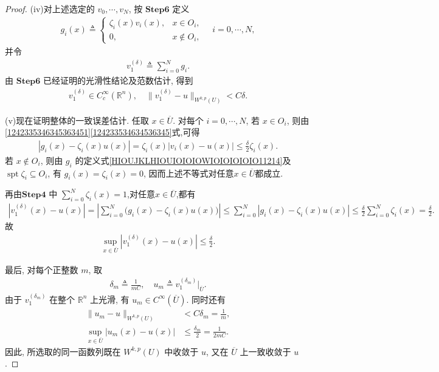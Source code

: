 \documentclass[../../main.tex]{subfiles}
\begin{document}
\begin{proof}
(iv)对上述选定的 $v_0,\cdots,v_N$, 按 $\mathbf{Step}\mathbf{6}$ 定义
\begin{align}\label{HIOUJKLHIOUIOIOIOWIOIOIOIOIO11214}
g_i(x)\triangleq
\begin{cases}
\zeta_i(x)v_i(x),&x\in O_i,\\
0,&x\notin O_i,
\end{cases}
\quad i=0,\cdots,N,
\end{align}
并令
\begin{align*}
v_1^{(\delta)}
\triangleq
\sum\limits_{i=0}^{N}g_i.
\end{align*}
由 $\mathbf{Step}\mathbf{6}$ 已经证明的光滑性结论及范数估计, 得到
\begin{align*}
v_1^{(\delta)}\in C_c^\infty(\mathbb{R}^{n}),\quad
\|v_1^{(\delta)}-u\|_{W^{k,p}(U)}<C\delta.
\end{align*}

(v)现在证明整体的一致误差估计. 任取 $x\in\overline{U}$.
对每个 $i=0,\cdots,N$, 若 $x\in O_i$, 则由\eqref{1242335346345363451}\eqref{124233534634536345}式,可得
\begin{align*}
|g_i(x)-\zeta_i(x)u(x)|
=
\zeta_i(x)|v_i(x)-u(x)|
\leqslant\frac{\delta}{2}\zeta_i(x).
\end{align*}
若 $x\notin O_i$, 则由 $g_i$ 的定义式\eqref{HIOUJKLHIOUIOIOIOWIOIOIOIOIO11214}及 $\operatorname{spt}\zeta_i\subseteq O_i$, 有
$g_i(x)=\zeta_i(x)=0$, 因而上述不等式对任意$x\in\overline{U}$都成立.

再由$\mathbf{Step}\mathbf{4}$ 中 $\sum\limits_{i=0}^{N}\zeta_i(x)=1$,对任意$x\in\overline{U}$,都有
\begin{align*}
|v_1^{(\delta)}(x)-u(x)|
=
\left|
\sum\limits_{i=0}^{N}
\bigl(g_i(x)-\zeta_i(x)u(x)\bigr)
\right|\leqslant
\sum\limits_{i=0}^{N}
|g_i(x)-\zeta_i(x)u(x)|
\leqslant
\frac{\delta}{2}
\sum\limits_{i=0}^{N}\zeta_i(x)
=\frac{\delta}{2}.
\end{align*}
故
\begin{align*}
\sup\limits_{x\in\overline{U}}
|v_1^{(\delta)}(x)-u(x)|
\leqslant\frac{\delta}{2}.
\end{align*}

最后, 对每个正整数 $m$, 取
\begin{align*}
\delta_m\triangleq\frac{1}{mC},\quad
u_m\triangleq v_1^{(\delta_m)}|_{\overline{U}}.
\end{align*}
由于 $v_1^{(\delta_m)}$ 在整个 $\mathbb{R}^{n}$ 上光滑, 有
$u_m\in C^\infty(\overline{U})$. 同时还有
\begin{align*}
\|u_m-u\|_{W^{k,p}(U)}
&<C\delta_m=\frac{1}{m},\\
\sup\limits_{x\in\overline{U}}|u_m(x)-u(x)|
&\leqslant\frac{\delta_m}{2}
=\frac{1}{2mC}.
\end{align*}
因此, 所选取的同一函数列既在 $W^{k,p}(U)$ 中收敛于 $u$, 又在 $\overline{U}$ 上一致收敛于 $u$.
\end{proof}
\end{document}
